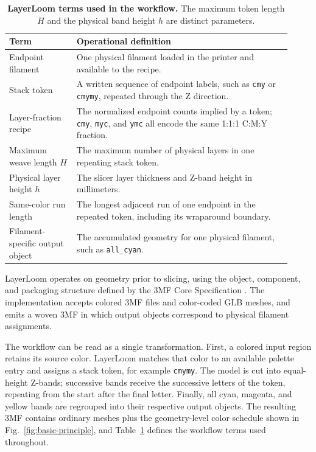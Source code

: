 \documentclass[5p,times,numbers]{elsarticle}
\begin{document}
\begin{table}[!t]
\centering
\caption{\textbf{LayerLoom terms used in the workflow.} The maximum token length \(H\) and the physical band height \(h\) are distinct parameters.}
\small
\begin{tabular}{p{0.22\linewidth}p{0.70\linewidth}}
\toprule
Term & Operational definition \\
\midrule
Endpoint filament & One physical filament loaded in the printer and available to the recipe. \\
Stack token & A written sequence of endpoint labels, such as \texttt{cmy} or \texttt{cmymy}, repeated through the Z direction. \\
Layer-fraction recipe & The normalized endpoint counts implied by a token; \texttt{cmy}, \texttt{myc}, and \texttt{ymc} all encode the same 1:1:1 C:M:Y fraction. \\
Maximum weave length \(H\) & The maximum number of physical layers in one repeating stack token. \\
Physical layer height \(h\) & The slicer layer thickness and Z-band height in millimeters. \\
Same-color run length & The longest adjacent run of one endpoint in the repeated token, including its wraparound boundary. \\
Filament-specific output object & The accumulated geometry for one physical filament, such as \texttt{all\_cyan}. \\
\bottomrule
\end{tabular}
\label{tab:terms}
\end{table}

LayerLoom operates on geometry prior to slicing, using the object, component, and packaging structure defined by the 3MF Core Specification \citep{three_mf_core_1_3}. The implementation accepts colored 3MF files and color-coded GLB meshes, and emits a woven 3MF in which output objects correspond to physical filament assignments.

The workflow can be read as a single transformation. First, a colored input region retains its source color. LayerLoom matches that color to an available palette entry and assigns a stack token, for example \texttt{cmymy}. The model is cut into equal-height Z-bands; successive bands receive the successive letters of the token, repeating from the start after the final letter. Finally, all cyan, magenta, and yellow bands are regrouped into their respective output objects. The resulting 3MF contains ordinary meshes plus the geometry-level color schedule shown in Fig.~\ref{fig:basic-principle}, and Table~\ref{tab:terms} defines the workflow terms used throughout.
\end{document}
